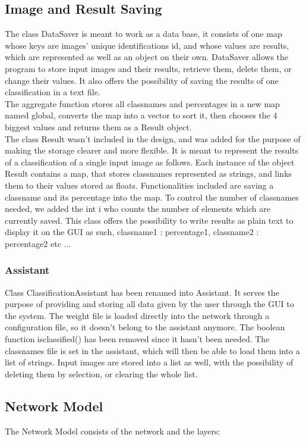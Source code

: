 \documentclass[parskip=full]{scrartcl}
\newcommand\tab[1][1cm]{\hspace*{#1}}
\begin{document}
	\subsection {Image and Result Saving}
	\tab The class DataSaver is meant to work as a data base, it consists of one map whose keys are images' unique identifications id, and whose values are results, which are represented as well as an object on their own. DataSaver allows the program to store input images and their results, retrieve them, delete them, or change their values. It also offers the possibility of saving the results of one classification in a text file. \\The aggregate function stores all classnames and percentages in a new map named global, converts the map into a vector to sort it, then chooses the 4 biggest values and returns them as a Result object.
\\The class Result wasn't included in the design, and was added for the purpose of making the storage clearer and more flexible. It is meant to represent the results of a classification of a single input image as follows. Each instance of the object Result contains a map, that stores classnames represented as strings, and links them to their values stored as floats. Functionalities included are saving a classname and its percentage into the map. To control the number of classnames needed, we added the int i who counts the number of elements which are currently saved. This class offers the possibility to write results as plain text to display it on the GUI as such, classname1 : percentage1, classname2 : percentage2 etc ... 
	\subsubsection {Assistant}
	\tab Class ClassificationAssistant has been renamed into Assistant. It serves the purpose of providing and storing all data given by the user through the GUI to the system. The weight file is loaded directly into the network through a configuration file, so it doesn't belong to the assistant anymore. The boolean function isclassified() has been removed since it hasn't been needed. The classnames file is set in the assistant, which will then be able to load them into a list of strings. Input images are stored into a list as well, with the possibility of deleting them by selection, or clearing the whole list.

	\subsection {Network Model}
	\tab The Network Model consists of the network and the layers:
	
\end{document}
